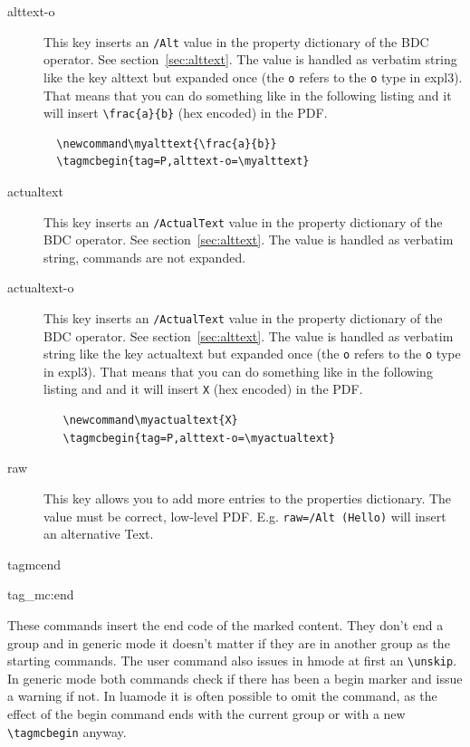 \documentclass[DIV=12,parskip=half-,bibliography=totoc]{scrartcl}
\newcommand\PrintKeyName[1]{\textsf{#1}}
\newcommand\PDF{PDF}
\begin{document}
\begin{description}
  \item[\PrintKeyName{alttext-o}]
  This key inserts an \texttt{/Alt} value in the property dictionary of the BDC operator. See section~\ref{sec:alttext}. The value is handled as verbatim string like the key \PrintKeyName{alttext} but expanded once (the \texttt{o} refers to the \texttt{o} type in expl3).
  That means that you can do something like in the following listing
  and it will insert \verb+\frac{a}{b}+  (hex encoded) in the \PDF{}.

  \begin{lstlisting}
  \newcommand\myalttext{\frac{a}{b}}
  \tagmcbegin{tag=P,alttext-o=\myalttext}
  \end{lstlisting}




  \item[\PrintKeyName{actualtext}]
  This key inserts an \texttt{/ActualText} value in the property dictionary of the BDC operator. See section~\ref{sec:alttext}. The value is handled as verbatim string, commands are not expanded.


  \item[\PrintKeyName{actualtext-o}]
  This key inserts an \texttt{/ActualText} value in the property dictionary of the BDC operator. See section~\ref{sec:alttext}. The value is handled as verbatim string like the key \PrintKeyName{actualtext} but expanded once (the \texttt{o} refers to the \texttt{o} type in expl3). That means that you can do something like in the following listing and and it will insert \verb+X+ (hex encoded)  in the \PDF{}.


  \begin{lstlisting}
   \newcommand\myactualtext{X}
   \tagmcbegin{tag=P,alttext-o=\myactualtext}
  \end{lstlisting}

  \item[\PrintKeyName{raw}]
  This key allows you to add more entries to the properties dictionary. The value must be correct, low-level \PDF{}. E.g. \verb+raw=/Alt (Hello)+ will insert an alternative Text.
\end{description}


\begin{docCommand}{tagmcend}{}\end{docCommand}
\begin{docCommand}{tag_mc:end}{}\end{docCommand}

These commands insert the end code of the marked content. They don't end a group and in generic mode it doesn't matter if they are in another group as the starting commands. The user command also issues in hmode at first an \verb+\unskip+. In generic mode both commands check if there has been a begin marker and issue a warning if not. In luamode it is often possible to omit the command, as the effect of the begin command ends with the current group or with a new \verb+\tagmcbegin+ anyway.
\end{document}
